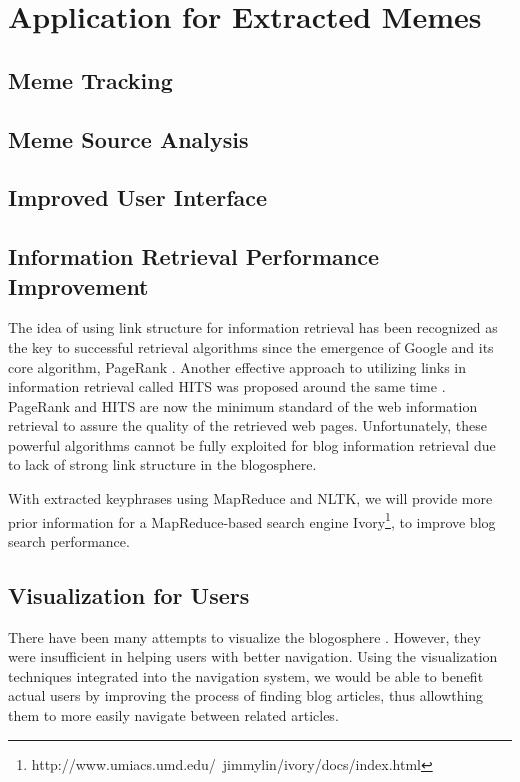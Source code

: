 \documentclass{sig-alternate}
\begin{document}
\section{Application for Extracted Memes}

\subsection{Meme Tracking}

\subsection{Meme Source Analysis}

\subsection{Improved User Interface}

\subsection{Information Retrieval Performance Improvement}

The idea of using link structure for information retrieval has been recognized as the key to successful retrieval algorithms since the emergence of Google and its core algorithm, PageRank \cite{Brin1998a}. Another effective approach to utilizing links in information retrieval called HITS was proposed around the same time \cite{Kleinberg1999}.  PageRank and HITS are now the minimum standard of the web information retrieval to assure the quality of the retrieved web pages. Unfortunately, these powerful algorithms cannot be fully exploited for blog information retrieval due to lack of strong link structure in the blogosphere. 

With extracted keyphrases using MapReduce and NLTK, we will provide more prior information for a MapReduce-based search engine Ivory\footnote{http://www.umiacs.umd.edu/~jimmylin/ivory/docs/index.html}, to improve blog search performance.


\subsection{Visualization for Users}

There have been many attempts to visualize the blogosphere \cite{Tauro2008, Uchida2007}. However, they were insufficient in helping users with better navigation. Using the visualization techniques integrated into the navigation system, we would be able to benefit actual users by improving the process of finding blog articles, thus allowthing them to more easily navigate between related articles.
\end{document}
